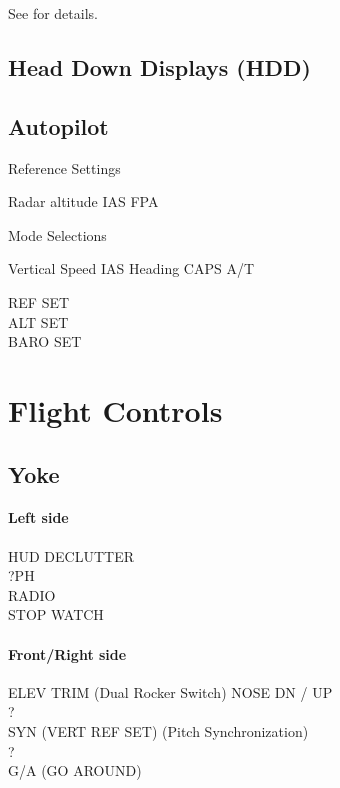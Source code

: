 See  for details.

\subsection{Head Down Displays (HDD)}
\label{sec:hdd}

\subsection{Autopilot}

Reference Settings
\begin{enumerate}
   Radar altitude
   \gls{IAS}
   \gls{FPA}
\end{enumerate}

Mode Selections
\begin{enumerate}
   Vertical Speed
   \gls{IAS}
   Heading
   \gls{CAPS}
   \gls{A/T}
\end{enumerate}

REF SET\\
ALT SET\\
BARO SET

\section{Flight Controls}

\subsection{Yoke}

\paragraph*{Left side}
HUD DECLUTTER\\
?PH\\
RADIO\\
STOP WATCH

\paragraph*{Front/Right side}
ELEV TRIM (Dual Rocker Switch) NOSE DN / UP\\
?\\
SYN (VERT REF SET) (Pitch Synchronization)\\
?\\
G/A (GO AROUND)

